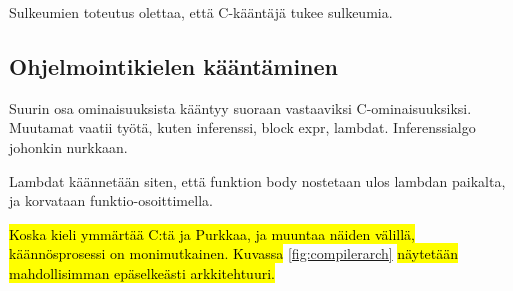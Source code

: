 Sulkeumien toteutus olettaa, että C-kääntäjä tukee sulkeumia.

\subsection{Ohjelmointikielen kääntäminen}

Suurin osa ominaisuuksista kääntyy suoraan vastaaviksi C-ominaisuuksiksi. Muutamat vaatii työtä,
kuten inferenssi, block expr, lambdat. Inferenssialgo johonkin nurkkaan.

Lambdat käännetään siten, että funktion body nostetaan ulos lambdan paikalta, ja korvataan funktio-osoittimella.

\hl{Koska kieli ymmärtää C:tä ja Purkkaa, ja muuntaa näiden välillä,
käännösprosessi on monimutkainen. Kuvassa} \ref{fig:compilerarch} \hl{näytetään
mahdollisimman epäselkeästi arkkitehtuuri.}

